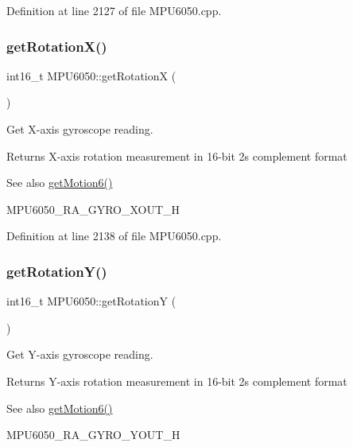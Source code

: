 Definition at line 2127 of file M\+P\+U6050.\+cpp.

\mbox{\label{classMPU6050_a268f52843a24992ff06a3f12392de584}} 
\subsubsection{\texorpdfstring{getRotationX()}{getRotationX()}}
{\footnotesize\ttfamily int16\+\_\+t M\+P\+U6050\+::get\+RotationX (\begin{DoxyParamCaption}{ }\end{DoxyParamCaption})}



Get X-\/axis gyroscope reading. 

\begin{DoxyReturn}{Returns}
X-\/axis rotation measurement in 16-\/bit 2\textquotesingle{}s complement format 
\end{DoxyReturn}
\begin{DoxySeeAlso}{See also}
\mbox{\hyperlink{classMPU6050_a574d3093dc131e4251a9b37adf208ca7}{get\+Motion6()}} 

M\+P\+U6050\+\_\+\+R\+A\+\_\+\+G\+Y\+R\+O\+\_\+\+X\+O\+U\+T\+\_\+H 
\end{DoxySeeAlso}


Definition at line 2138 of file M\+P\+U6050.\+cpp.

\mbox{\label{classMPU6050_a97cbe7f10dd27e07bd78d1c25e4286b5}} 
\subsubsection{\texorpdfstring{getRotationY()}{getRotationY()}}
{\footnotesize\ttfamily int16\+\_\+t M\+P\+U6050\+::get\+RotationY (\begin{DoxyParamCaption}{ }\end{DoxyParamCaption})}



Get Y-\/axis gyroscope reading. 

\begin{DoxyReturn}{Returns}
Y-\/axis rotation measurement in 16-\/bit 2\textquotesingle{}s complement format 
\end{DoxyReturn}
\begin{DoxySeeAlso}{See also}
\mbox{\hyperlink{classMPU6050_a574d3093dc131e4251a9b37adf208ca7}{get\+Motion6()}} 

M\+P\+U6050\+\_\+\+R\+A\+\_\+\+G\+Y\+R\+O\+\_\+\+Y\+O\+U\+T\+\_\+H 
\end{DoxySeeAlso}


